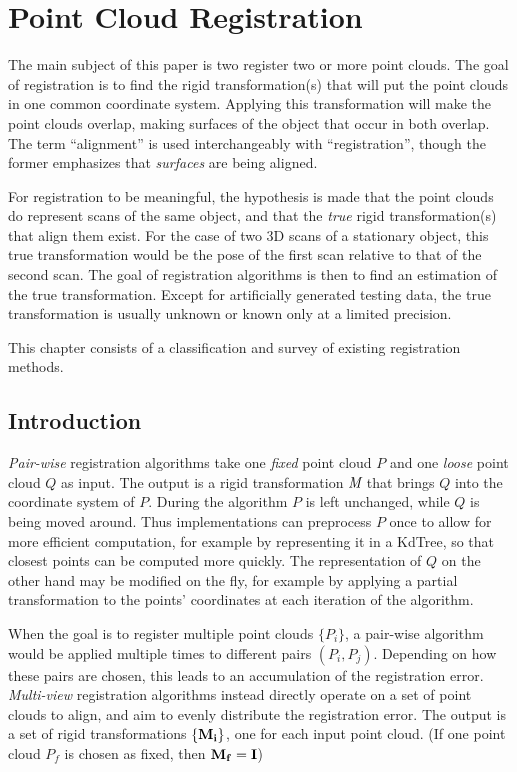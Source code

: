 \chapter{Point Cloud Registration} \label{ch:pcreg}
The main subject of this paper is two register two or more point clouds. The goal of registration is to find the rigid transformation(s) that will put the point clouds in one common coordinate system. Applying this transformation will make the point clouds overlap, making surfaces of the object that occur in both overlap. The term ``alignment'' is used interchangeably with ``registration'', though the former emphasizes that \emph{surfaces} are being aligned.

For registration to be meaningful, the hypothesis is made that the point clouds do represent scans of the same object, and that the \emph{true} rigid transformation(s) that align them exist. For the case of two 3D scans of a stationary object, this true transformation would be the pose of the first scan relative to that of the second scan. The goal of registration algorithms is then to find an estimation of the true transformation. Except for artificially generated testing data, the true transformation is usually unknown or known only at a limited precision.

This chapter consists of a classification and survey of existing registration methods.

\section{Introduction}

\emph{Pair-wise} registration algorithms take one \emph{fixed} point cloud $P$ and one \emph{loose} point cloud $Q$ as input. The output is a rigid transformation $\emph{M}$ that brings $Q$ into the coordinate system of $P$. During the algorithm $P$ is left unchanged, while $Q$ is being moved around. Thus implementations can preprocess $P$ once to allow for more efficient computation, for example by representing it in a KdTree, so that closest points can be computed more quickly. The representation of $Q$ on the other hand may be modified on the fly, for example by applying a partial transformation to the points' coordinates at each iteration of the algorithm.

When the goal is to register multiple point clouds $\{ P_i \}$, a pair-wise algorithm would be applied multiple times to different pairs $(P_i, P_j)$. Depending on how these pairs are chosen, this leads to an accumulation of the registration error. \emph{Multi-view} registration algorithms instead directly operate on a set of point clouds to align, and aim to evenly distribute the registration error. The output is a set of rigid transformations $\{ \mathbf{M_i} \}$, one for each input point cloud. (If one point cloud $P_f$ is chosen as fixed, then $\mathbf{M_f} = \mathbf{I}$)

